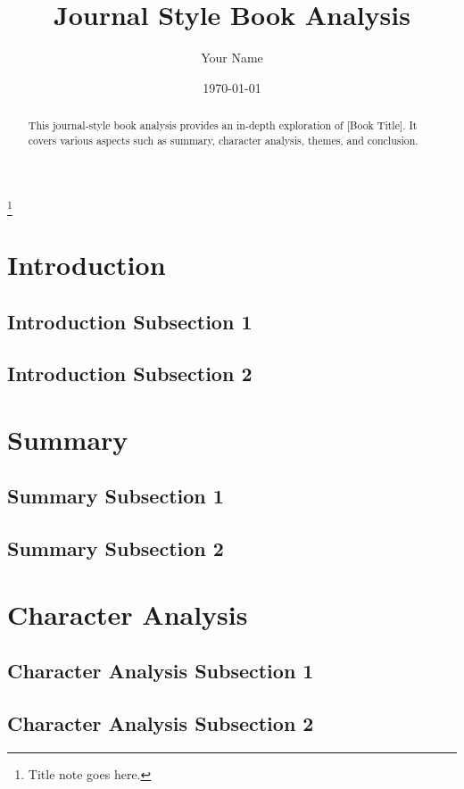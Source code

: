 \documentclass[12pt, letterpaper]{article}
\title{Journal Style Book Analysis}
\author{Your Name}
\date{\today}
\renewcommand{\maketitle}{
  \begin{titlepage}
    \begin{center}
      \vspace*{1cm}
      {\Huge\bfseries\thetitle\par}
      \vspace{0.5cm}
      {\Large\theauthor\thanks{Title note goes here.}\par}
      \vspace{0.5cm}
      {\large\thedate\par}
      \vspace{0.5cm}
      {\large\titlecite\par} %
      \vspace{1.5cm}
    \end{center}
  \end{titlepage}
}
\newcommand{\titlecite}[1]{\gdef\titlecite{\textit{#1}}}
\begin{document}
\maketitle

\begin{abstract}
This journal-style book analysis provides an in-depth exploration of [Book Title]. It covers various aspects such as summary, character analysis, themes, and conclusion.
\end{abstract}

\section{Introduction}
\lipsum[1-2]

\subsection{Introduction Subsection 1}
\lipsum[11-12]

\subsection{Introduction Subsection 2}
\lipsum[13-14]

\section{Summary}
\lipsum[3-4]

\subsection{Summary Subsection 1}
\lipsum[15-16]

\subsection{Summary Subsection 2}
\lipsum[17-18]

\section{Character Analysis}
\lipsum[5-6]

\subsection{Character Analysis Subsection 1}
\lipsum[19-20]

\subsection{Character Analysis Subsection 2}
\lipsum[21-22]
\end{document}
